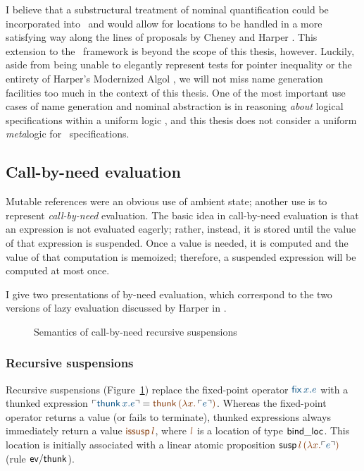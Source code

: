 I believe that a substructural treatment of nominal quantification
could be incorporated into \sls~and would allow for locations to be
handled in a more satisfying way along the lines of proposals by
Cheney and Harper \cite{cheney12dependent,harper12practical}. This
extension to the \sls~framework is beyond the scope of this thesis,
however. Luckily, aside from being unable to elegantly represent tests
for pointer inequality or the entirety of Harper's Modernized Algol
\cite[Chapter 35]{harper12practical}, we will not miss name generation
facilities too much in the context of this thesis. One of the most important
use cases of name generation and nominal abstraction is in reasoning
{\it about} logical specifications within a uniform logic
\cite{gacek11nominal}, and this thesis does not consider a uniform {\it
  meta}logic for \sls~specifications.

\subsection{Call-by-need evaluation}
\label{sec:call-by-need}

Mutable references were
an obvious use of ambient state; another use is to
represent {\it call-by-need} evaluation. The basic idea in
call-by-need evaluation is that an expression is not evaluated
eagerly; rather, instead, it is stored until the value of that
expression is suspended. Once a value is
needed, it is computed and the value of that computation is memoized;
therefore, a suspended expression will be computed at most once.

I give two presentations of by-need evaluation, which correspond to
the two versions of lazy evaluation discussed by Harper in
\cite[Chapter 37]{harper12practical}.



\begin{figure}[t]
\caption{Semantics of call-by-need recursive suspensions}
\label{fig:ssos-cbneed}
\end{figure}

\subsubsection{Recursive suspensions}


Recursive suspensions (Figure~\ref{fig:ssos-cbneed}) replace the
fixed-point operator $\obj{{\sf fix}\,x.e}$ with a thunked expression
$\interp{{\sf thunk}\,x.e} = \lf{{\sf thunk}\,(\lambda
x.\,\interp{e})}$. Whereas the fixed-point operator returns a value (or
fails to terminate), thunked expressions always immediately return a
value $\lf{{\sf issusp}\,l}$, where $\lf{l}$ is a location of type ${\sf
  bind\_loc}$. This location is initially associated with a linear
atomic proposition ${\sf susp}\,\lf{l}\,\lf{(\lambda x.\interp{e})}$ 
(rule ${\sf
  ev/thunk}$).

